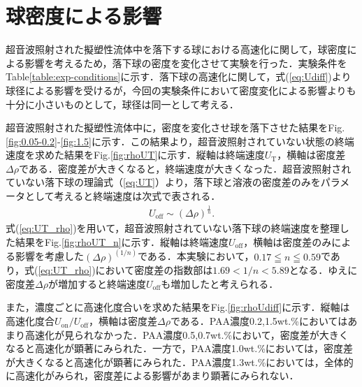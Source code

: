 \section{球密度による影響}
\label{sec:density}
超音波照射された擬塑性流体中を落下する球における高速化に関して，球密度による影響を考えるため，落下球の密度を変化させて実験を行った．実験条件をTable\ref{table:exp-conditions}に示す．落下球の高速化に関して，式(\ref{eq:Udiff})より球径による影響を受けるが，今回の実験条件において密度変化による影響よりも十分に小さいものとして，球径は同一として考える．

超音波照射された擬塑性流体中に，密度を変化させ球を落下させた結果をFig.\ref{fig:0.05-0.2}-\ref{fig:1.5}に示す．この結果より，超音波照射されていない状態の終端速度を求めた結果をFig.\ref{fig:rhoUT}に示す．縦軸は終端速度$U_\text{T}$，横軸は密度差$\Delta\rho$である．密度差が大きくなると，終端速度が大きくなった．超音波照射されていない落下球の理論式（\ref{eq:UT}）より，落下球と溶液の密度差のみをパラメータとして考えると終端速度は次式で表される．
\begin{eqnarray}
    U_\text{off}\sim \left(\Delta\rho\right)^{\frac{1}{n}} .
    \label{eq:UT_rho}
\end{eqnarray}
式(\ref{eq:UT_rho})を用いて，超音波照射されていない落下球の終端速度を整理した結果をFig.\ref{fig:rhoUT_n}に示す．縦軸は終端速度$U_\text{off}$，横軸は密度差のみによる影響を考慮した$\left(\Delta\rho\right)^{\left(1/n\right)}$である．本実験において，$0.17\leqq n\leqq0.59$であり，式(\ref{eq:UT_rho})において密度差の指数部は$1.69<1/n<5.89$となる．ゆえに密度差$\Delta\rho$が増加すると終端速度$U_\text{off}$も増加したと考えられる．

また，濃度ごとに高速化度合いを求めた結果をFig.\ref{fig:rhoUdiff}に示す．縦軸は高速化度合$U_\text{on}/U_\text{off}$，横軸は密度差$\Delta\rho$である．PAA濃度0.2,1.5wt.\%においてはあまり高速化が見られなかった．PAA濃度0.5,0.7wt.\%において，密度差が大きくなると高速化が顕著にみられた．一方で，PAA濃度1.0wt.\%においては，密度差が大きくなると高速化が顕著にみられた．PAA濃度1.3wt.\%においては，全体的に高速化がみられ，密度差による影響があまり顕著にみられない．

